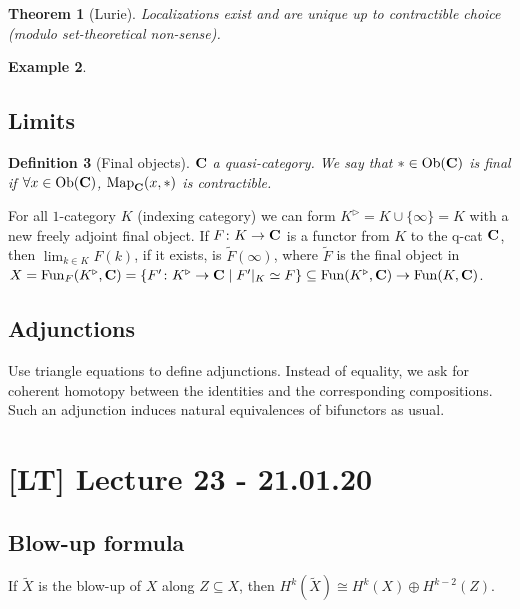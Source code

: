 \documentclass[A4paper, british]{amsart}
\theoremstyle{darkgreentheorem}
\newtheorem{thm}{Theorem}[section]
\theoremstyle{darkbluedefinition}
\newtheorem{defn}[thm]{Definition}
\theoremstyle{darkredexample}
\newtheorem{exa}[thm]{Example}
\theoremstyle{remark}
\DeclareMathOperator{\Fun}{Fun}
\DeclareMathOperator{\Ob}{Ob}
\DeclareMathOperator{\Map}{Map}
\newcommand{\QCat}{\mathbf{QCat}}
\newcommand{\1}{\mathbbm{1}}
\newcommand{\op}{\oplus}
\newcommand{\sub}{\subseteq}
\begin{document}
\begin{thm}[Lurie]
    Localizations exist and are unique up to contractible choice (modulo set-theoretical non-sense).
\end{thm}

\begin{exa}
    \begin{center}
    \end{center}
\end{exa}

\subsection{Limits}

\begin{defn}[Final objects]
    $\mathbf{C}$ a quasi-category.
    We say that $*\in \Ob(\bfC)$ is \textit{final} if $\forall x\in \Ob(\bfC)$, $\Map_{\bfC}(x,*)$ is contractible.
\end{defn}

For all $1$-category $K$ (indexing category) we can form $K^{\triangleright}=K\cup \{\infty\}=K$ with a new freely adjoint final object.
If $F\colon K\to \mathbf{C}$ is a functor from $K$ to the q-cat $\mathbf{C}$, then $\lim_{k\in K}F(k)$, if it exists, is $\tilde{F}(\infty)$, where $\tilde{F}$ is the final object in $X=\Fun_{F}(K^{\triangleright},\bfC)=\{F'\colon K^{\triangleright}\to \bfC \mid F'|_{K}\simeq F\}\sub\Fun(K^{\triangleright},\bfC)\to \Fun(K,\bfC)$.

\subsection{Adjunctions}
Use triangle equations to define adjunctions.
Instead of equality, we ask for coherent homotopy between the identities and the corresponding compositions.
Such an adjunction induces natural equivalences of bifunctors as usual.

\section{[LT] Lecture 23 - 21.01.20}

\subsection{Blow-up formula}
If $\tilde{X}$ is the blow-up of $X$ along $Z\sub X$, then $H^{k}(\tilde{X})\cong H^{k}(X)\op H^{k-2}(Z)$.
\end{document}
